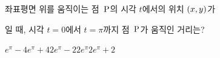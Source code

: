 \hspace*{2mm}\begin{minipage}[t]{\dimexpr\linewidth-2mm\relax}\vspace{0pt}
좌표평면 위를 움직이는 점~$\mathrm{P}$의 시각 $t$에서의 위치 $(x{,}\mkern3mu\mathopen{}y)$가 \par\smallskip{}\par\smallskip\noindent 일 때, 시각 $t=0$에서 $t=\pi$까지 점~$\mathrm{P}$가 움직인 거리는?
\begin{choices32}{$e^{\pi}-4$}{$e^{\pi}+4$}{$2e^{\pi}-2$}{$2e^{\pi}$}{$2e^{\pi}+2$}\end{choices32}\end{minipage}
